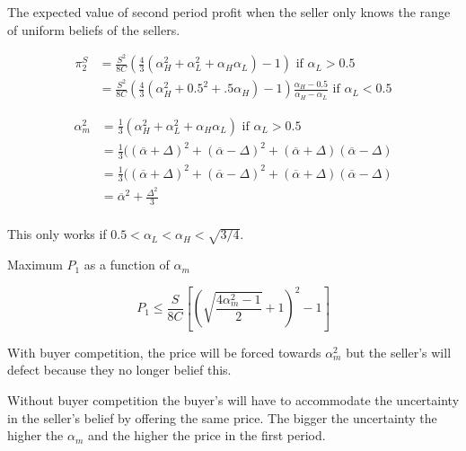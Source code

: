 \documentclass{article}
\begin{document}
The expected value of second period profit when the seller only knows the range of uniform beliefs of the sellers.

\begin{align*}
\pi^S_2 &= \frac{S^2}{8C}(\frac{4}{3}(\alpha_H^2 + \alpha_L^2 + \alpha_H \alpha_L) - 1) \text{ if } \alpha_L > 0.5 \\
&= \frac{S^2}{8C}(\frac{4}{3}(\alpha_H^2 + 0.5^2 + .5 \alpha_H) - 1) \frac{\alpha_H - 0.5}{\alpha_H - \alpha_L} \text{ if } \alpha_L < 0.5
\end{align*}

\begin{align*}
\alpha_m^2 &= \frac{1}{3}(\alpha_H^2 + \alpha^2_L + \alpha_H \alpha_L) \text{ if } \alpha_L > 0.5 \\
&= \frac{1}{3} ((\overline{\alpha} + \Delta)^2 + (\overline{\alpha} - \Delta)^2 + (\overline{\alpha} + \Delta) (\overline{\alpha} - \Delta) \\
&= \frac{1}{3} ((\overline{\alpha} + \Delta)^2 + (\overline{\alpha} - \Delta)^2 + (\overline{\alpha} + \Delta) (\overline{\alpha} - \Delta) \\
&= \overline{\alpha}^2 + \frac{\Delta^2}{3} \\
\end{align*}

This only works if $0.5 < \alpha_L < \alpha_H < \sqrt{3/4}$. 

Maximum $P_1$ as a function of $\alpha_m$


$$
P_1 \leq \frac{S}{8C}
    [(\sqrt{\frac{4 \alpha_m^2 - 1}{2}} + 1)^2 - 1]
$$

With buyer competition, the price will be forced towards $\alpha_m^2$ but the seller's will defect because they no longer belief this.

Without buyer competition the buyer's will have to accommodate the uncertainty in the seller's belief by offering the same price. The bigger the uncertainty the higher the $\alpha_m$ and the higher the price in the first period. 



\end{document}
